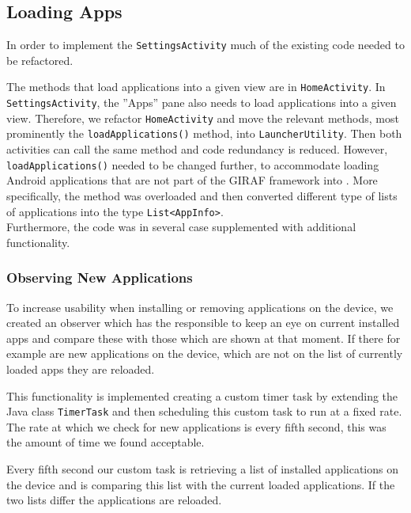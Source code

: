 \subsection{Loading Apps}\label{sect:sprint3:refactoring}
In order to implement the \lstinline!SettingsActivity! much of the existing code needed to be refactored.

The methods that load applications into a given view are in \lstinline!HomeActivity!.
In \lstinline!SettingsActivity!, the ''Apps'' pane also needs to load applications into a given view.
Therefore, we refactor \lstinline!HomeActivity! and move the relevant methods, most prominently the \lstinline|loadApplications()| method, into \lstinline!LauncherUtility!.
Then both activities can call the same method and code redundancy is reduced. 
However, \lstinline|loadApplications()| needed to be changed further, to accommodate loading Android applications that are not part of the GIRAF framework  into \launcher. 
More specifically, the method was overloaded and then converted different type of lists of applications into the \giraf type \lstinline|List<AppInfo>|.\\

Furthermore, the code was in several case supplemented with additional functionality.

\subsubsection{Observing New Applications}\label{sec:sprint3:observing}
To increase usability when installing or removing applications on the device, we created an observer which has the responsible to keep an eye on current installed apps and compare these with those which are shown at that moment. If there for example are new applications on the device, which are not on the list of currently loaded apps they are reloaded.

This functionality is implemented creating a custom timer task by extending the Java class \lstinline!TimerTask! and then scheduling this custom task to run at a fixed rate. The rate at which we check for new applications is every fifth second, this was the amount of time we found acceptable.

Every fifth second our custom task is retrieving a list of installed applications on the device and is comparing this list with the current loaded applications. If the two lists differ the applications are reloaded.